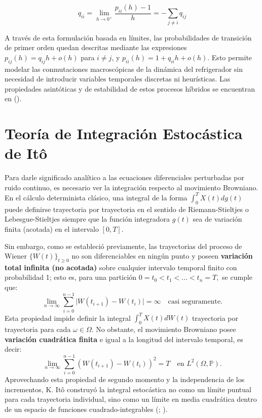 \documentclass[
  spanish,
  us-letterpaper,
]{scrreprt}
\numberwithin{equation}{section}
\theoremstyle{plain}
\theoremstyle{plain}
\theoremstyle{plain}
\theoremstyle{definition}
\theoremstyle{remark}
\begin{document}
\[
q_{ii} = \lim_{h \to 0^+} \frac{p_{ii}(h) - 1}{h} = -\sum_{j \neq i} q_{ij}
\]

A través de esta formulación basada en límites, las probabilidades de
transición de primer orden quedan descritas mediante las expresiones
\(p_{ij}(h) = q_{ij}h + o(h)\) para \(i \neq j\), y
\(p_{ii}(h) = 1 + q_{ii}h + o(h)\). Esto permite modelar las
conmutaciones macroscópicas de la dinámica del refrigerador sin
necesidad de introducir variables temporales discretas ni heurísticas.
Las propiedades asintóticas y de estabilidad de estos procesos híbridos
se encuentran en ().

\section{Teoría de Integración Estocástica de
Itô}\label{teoruxeda-de-integraciuxf3n-estocuxe1stica-de-ituxf4}

Para darle significado analítico a las ecuaciones diferenciales
perturbadas por ruido continuo, es necesario ver la integración respecto
al movimiento Browniano. En el cálculo determinista clásico, una
integral de la forma \(\displaystyle \int_0^T X(t) dg(t)\) puede
definirse trayectoria por trayectoria en el sentido de Riemann-Stieltjes
o Lebesgue-Stieltjes siempre que la función integradora \(g(t)\) sea de
variación finita (acotada) en el intervalo \([0, T]\).

Sin embargo, como se estableció previamente, las trayectorias del
proceso de Wiener \(\{W(t)\}_{t \ge 0}\) no son diferenciables en ningún
punto y poseen \textbf{variación total infinita (no acotada)} sobre
cualquier intervalo temporal finito con probabilidad 1; esto es, para
una partición \(0 = t_0 < t_1 < \dots < t_n = T,\) se cumple que: \[
\lim_{n \to \infty} \sum_{i=0}^{n-1} \vert W(t_{i+1}) - W(t_i) \vert = \infty \quad \text{casi seguramente.}
\] Esta propiedad impide definir la integral
\(\displaystyle \int_0^T X(t) dW(t)\) trayectoria por trayectoria para
cada \(\omega \in \Omega\). No obstante, el movimiento Browniano posee
\textbf{variación cuadrática finita} e igual a la longitud del intervalo
temporal, es decir: \[
\lim_{n \to \infty} \sum_{i=0}^{n-1} \left( W(t_{i+1}) - W(t_i) \right)^2 = T \quad \text{en } L^2(\Omega, \mathbb{P}).
\] Aprovechando esta propiedad de segundo momento y la independencia de
los incrementos, K. Itô construyó la integral estocástica no como un
límite puntual para cada trayectoria individual, sino como un límite en
media cuadrática dentro de un espacio de funciones cuadrado-integrables
(;
).
\end{document}
